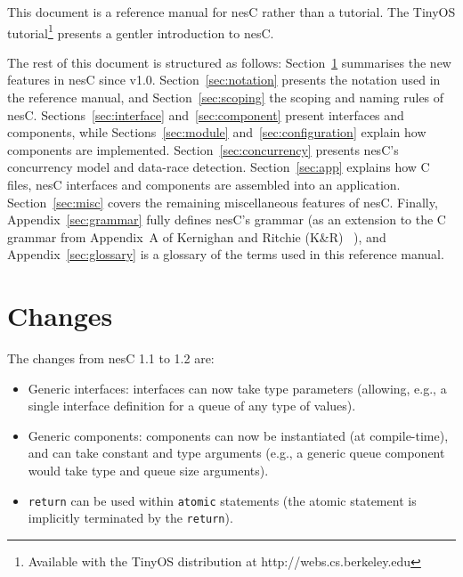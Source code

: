\documentclass[11pt,letterpaper]{article}
\newcommand{\kw}[1]{{\tt #1}}
\newcommand{\nesc}{nesC\xspace}
\newcommand{\tinyos}{TinyOS\xspace}
\begin{document}
This document is a reference manual for \nesc rather than a tutorial. The
\tinyos tutorial\footnote{Available with the \tinyos distribution at
http://webs.cs.berkeley.edu} presents a gentler introduction to \nesc.

The rest of this document is structured as follows:
Section~\ref{sec:changes} summarises the new features in \nesc since v1.0.
Section~\ref{sec:notation} presents the notation used in the reference
manual, and Section~\ref{sec:scoping} the scoping and naming rules of
\nesc. Sections~\ref{sec:interface} and~\ref{sec:component} present
interfaces and components, while Sections~\ref{sec:module}
and~\ref{sec:configuration} explain how components are
implemented. Section~\ref{sec:concurrency} presents \nesc's concurrency
model and data-race detection. Section~\ref{sec:app} explains how C files,
\nesc interfaces and components are assembled into an
application. Section~\ref{sec:misc} covers the remaining miscellaneous
features of \nesc. Finally, Appendix~\ref{sec:grammar} fully defines
\nesc's grammar (as an extension to the C grammar from Appendix~A of
Kernighan and Ritchie (K\&R) ~\cite[pp234--239]{kandr}), and
Appendix~\ref{sec:glossary} is a glossary of the terms used in this
reference manual.

\section{Changes}
\label{sec:changes}

The changes from \nesc 1.1 to 1.2 are:
\begin{itemize}
\item Generic interfaces: interfaces can now take type parameters
(allowing, e.g., a single interface definition for a queue of any type of
values).

\item Generic components: components can now be instantiated (at
compile-time), and can take constant and type arguments (e.g., a generic queue
component would take type and queue size arguments).

\item \kw{return} can be used within \kw{atomic} statements (the atomic
statement is implicitly terminated by the \kw{return}).
\end{itemize}
\end{document}
